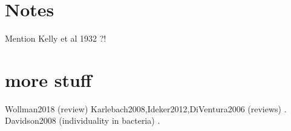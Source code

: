 %
%
%




\section*{Notes}

Mention Kelly et al 1932 \cite{Kelly1932}?!

\section*{more stuff}


Wollman2018 (review)
Karlebach2008,Ideker2012,DiVentura2006 (reviews) \cite{Karlebach2008,Ideker2012,DiVentura2006}.
Davidson2008 (individuality in bacteria) \cite{Davidson2008}.



